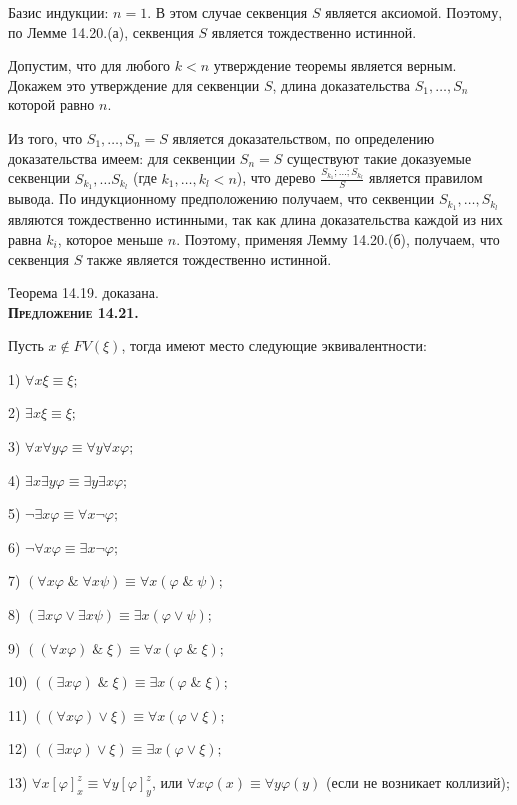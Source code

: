 \documentclass[18pt, a4paper]{extarticle}
\newcommand{\ampersand}{\;\&\;}
\begin{document}
Базис индукции: $n=1$. В этом случае секвенция $S$ является аксиомой. Поэтому, по Лемме 14.20.(а), секвенция $S$ является тождественно истинной.

Допустим, что для любого $k<n$ утверждение теоремы является верным. Докажем это утверждение для секвенции $S$, длина доказательства $S_1,\ldots,S_n$ которой равно $n$.

Из того, что $S_1,\ldots,S_n = S$ является доказательством, по определению доказательства имеем: для секвенции $S_n= S$ существуют такие доказуемые секвенции $S_{k_1},\ldots S_{k_l}$ (где $k_1,\ldots,k_l < n$), что дерево $\displaystyle\frac{S_{k_1};\ldots;S_{k_l}}{S}$ является правилом вывода. По индукционному предположению получаем, что секвенции $S_{k_1},\ldots,S_{k_l}$ являются тождественно истинными, так как длина доказательства каждой из них равна $k_i$, которое меньше $n$. Поэтому, применяя Лемму 14.20.(б), получаем, что секвенция $S$ также является тождественно истинной.

Теорема 14.19. доказана.\\

\textbf{\textsc{Предложение 14.21.}} 

Пусть $x\notin FV(\xi)$, тогда имеют место следующие эквивалентности:

1) $\forall x\xi\equiv\xi;$

2) $\exists x\xi\equiv\xi;$

3) $\forall x\forall y\varphi\equiv\forall y\forall x\varphi;$

4) $\exists x\exists y\varphi\equiv\exists y\exists x\varphi;$

5) $\lnot\exists x\varphi\equiv\forall x\lnot\varphi;$

6) $\lnot\forall x\varphi\equiv\exists x\lnot\varphi;$

7) $(\forall x\varphi\ampersand\forall x\psi)\equiv\forall x(\varphi\ampersand\psi);$

8) $(\exists x\varphi\vee\exists x\psi)\equiv\exists x(\varphi\vee\psi);$

9) $((\forall x\varphi)\ampersand\xi)\equiv\forall x(\varphi\ampersand\xi);$

10) $((\exists x\varphi)\ampersand\xi)\equiv\exists x(\varphi\ampersand\xi);$

11) $((\forall x\varphi)\vee\xi)\equiv\forall x(\varphi\vee\xi);$

12) $((\exists x\varphi)\vee\xi)\equiv\exists x(\varphi\vee\xi);$

13) $\forall x[\varphi]^z_x\equiv\forall y[\varphi]^z_y$, или $\forall x\varphi(x)\equiv\forall y\varphi(y)$ (если не возникает коллизий);
\end{document}
